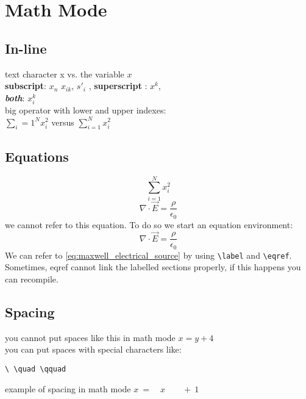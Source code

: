 \documentclass[12pt]{article}                       %
\begin{document}
\section*{Math Mode}
\subsection*{In-line}
\noindent
text character x vs. the variable $x$\\
\textbf{subscript}: $x_n$ $x_{ik}$, $s'_i$ , \textbf{superscript} : $x^k$,\\
\textbf{\textit{both}}: $x_i^k$\\                   %
big operator with lower and upper indexes:\\
$\sum_i=1^N x_i^2$ versus $\sum_{i=1}^N x_i^2$      %




\subsection*{Equations}
\[ \sum_{i=1}^N x_i^2 \]
\[ \nabla \cdot \vec{E} = \frac{\rho}{\epsilon_0} \] 
we cannot refer to this equation. To do so we start an equation environment:
\begin{equation}
    \nabla \cdot \vec{E} = \frac{\rho}{\epsilon_0}
    \label{eq:maxwell_electrical_source}
\end{equation}
We can refer to \eqref{eq:maxwell_electrical_source} by using \verb|\label| and \verb|\eqref|.\\
Sometimes, eqref cannot link the labelled sections properly, if this happens you can recompile.

%
 



\vspace{20px}
\subsection*{Spacing}
\noindent
you cannot put spaces like this in math mode $x  =    y   +   4$\\
you can put spaces with special characters like:
\begin{verbatim}
\ \quad \qquad 
\end{verbatim}
example of spacing in math mode $ x \ = \quad x \qquad + \ 1$
\end{document}
